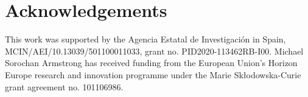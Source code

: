 \documentclass[preprint,12pt]{elsarticle}
\begin{document}
\section{Acknowledgements}

This work was supported by the Agencia Estatal de Investigación in Spain, MCIN/AEI/10.13039/501100011033, grant no. PID2020-113462RB-I00. Michael Sorochan Armstrong has received funding from the European Union's Horizon Europe research and innovation programme under the Marie Skłodowska-Curie grant agreement no. 101106986.

  
 





\end{document}
